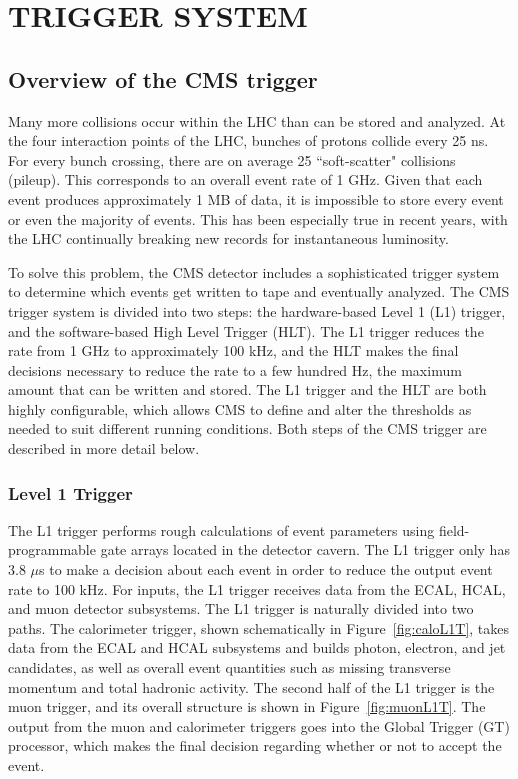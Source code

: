 \chapter{TRIGGER SYSTEM}
\label{chap:Trigger}

\section{Overview of the CMS trigger}
\label{sec:trigOverview}
Many more collisions occur within the LHC than can be stored and analyzed. At the four interaction points of the LHC, bunches of protons collide every 25 ns. For every bunch crossing, there are on average 25 ``soft-scatter" collisions (pileup). This corresponds to an overall event rate of 1 GHz. Given that each event produces approximately 1 MB of data, it is impossible to store every event or even the majority of events. This has been especially true in recent years, with the LHC continually breaking new records for instantaneous luminosity. 

To solve this problem, the CMS detector includes a sophisticated trigger system to determine which events get written to tape and eventually analyzed. The CMS trigger system is divided into two steps: the hardware-based Level 1 (L1) trigger, and the software-based High Level Trigger (HLT). The L1 trigger reduces the rate from 1 GHz to approximately 100 kHz, and the HLT makes the final decisions necessary to reduce the rate to a few hundred Hz, the maximum amount that can be written and stored. The L1 trigger and the HLT are both highly configurable, which allows CMS to define and alter the thresholds as needed to suit different running conditions. Both steps of the CMS trigger are described in more detail below. 


\subsection{Level 1 Trigger}
\label{sec:L1}
The L1 trigger performs rough calculations of event parameters using field-programmable gate arrays located in the detector cavern. The L1 trigger only has 3.8 $\mu$s to make a decision about each event in order to reduce the output event rate to 100 kHz. For inputs, the L1 trigger receives data from the ECAL, HCAL, and muon detector subsystems. The L1 trigger is naturally divided into two paths. The calorimeter trigger, shown schematically in Figure~\ref{fig:caloL1T}, takes data from the ECAL and HCAL subsystems and builds photon, electron, and jet candidates, as well as overall event quantities such as missing transverse momentum and total hadronic activity. The second half of the L1 trigger is the muon trigger, and its overall structure is shown in Figure~\ref{fig:muonL1T}. The output from the muon and calorimeter triggers goes into the Global Trigger (GT) processor, which makes the final decision regarding whether or not to accept the event. 


